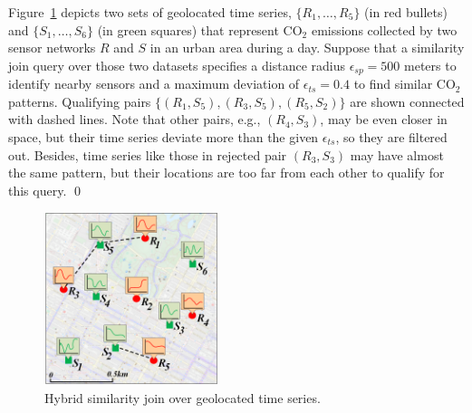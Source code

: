 \begin{myexample}
Figure~\ref{fig:simjoin_example} depicts two sets of geolocated time series, $\{R_1, \dots, R_5\}$ (in red bullets) and $\{S_1, \dots, S_6\}$ (in green squares) that represent CO$_2$ emissions collected by two sensor networks $R$ and $S$ in an urban area during a day. Suppose that a similarity join query over those two datasets specifies a distance radius $\epsilon_{sp} = 500$ meters to identify nearby sensors and a maximum deviation of $\epsilon_{ts} = 0.4$ to find similar CO$_2$ patterns. Qualifying pairs  $\{ (R_1, S_5), (R_3, S_5),  (R_5, S_2) \}$ are shown connected with dashed lines. Note that other pairs, e.g., $(R_4, S_3)$, may be even closer in space, but their time series deviate more than the given $\epsilon_{ts}$, so they are filtered out. Besides, time series like those in rejected pair $(R_3, S_3)$ may have almost the same pattern, but their locations are too far from each other to qualify for this query.
\qed
\end{myexample}

\begin{figure}[!tb]
 \centering
 \includegraphics[width=0.45\textwidth]{figures/sim_join.png}
 \caption{Hybrid similarity join over geolocated time series.}
\label{fig:simjoin_example}
\end{figure}